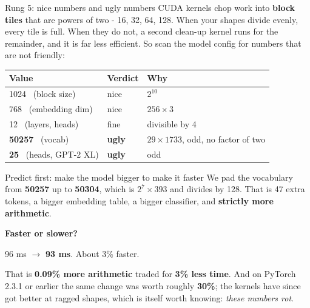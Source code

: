 \documentclass[aspectratio=169]{beamer}
\begin{document}
\begin{frame}{Rung 5: nice numbers and ugly numbers}
  CUDA kernels chop work into \textbf{block tiles} that are powers of two - 16, 32, 64,
  128. When your shapes divide evenly, every tile is full. When they do not, a second
  clean-up kernel runs for the remainder, and it is far less efficient.
  \vskip 6pt
  So scan the model config for numbers that are not friendly:
  \vskip 4pt
  \begin{center}
    \begin{tabular}{lll}
      \toprule
      \textbf{Value} & \textbf{Verdict} & \textbf{Why} \\
      \midrule
      1024 \ (block size)   & nice  & $2^{10}$ \\
      768 \ (embedding dim) & nice  & $256 \times 3$ \\
      12 \ (layers, heads)  & fine  & divisible by 4 \\
      \textbf{50257} \ (vocab)   & {\color{armred}\textbf{ugly}} & $29 \times 1733$, odd, no factor of two \\
      \textbf{25} \ (heads, GPT-2 XL) & {\color{armred}\textbf{ugly}} & odd \\
      \bottomrule
    \end{tabular}
  \end{center}
\end{frame}

\begin{frame}{Predict first: make the model bigger to make it faster}
  We pad the vocabulary from \textbf{50257} up to \textbf{50304}, which is
  $2^7 \times 393$ and divides by 128.
  \vskip 4pt
  That is 47 extra tokens, a bigger embedding table, a bigger classifier, and
  \textbf{strictly more arithmetic}.
  \vskip 8pt
  \begin{center}
    \textbf{Faster or slower?}
  \end{center}
  \pause
  \vskip 6pt
  \begin{center}
    {\color{paramgreen}\Large 96 ms $\rightarrow$ \textbf{93 ms}. About 3\% faster.}
  \end{center}
  \vskip 6pt
  {\footnotesize That is \textbf{0.09\% more arithmetic} traded for \textbf{3\% less
  time}. And on PyTorch 2.3.1 or earlier the same change was worth roughly \textbf{30\%};
  the kernels have since got better at ragged shapes, which is itself worth knowing:
  \emph{these numbers rot}.}
\end{frame}
\end{document}

